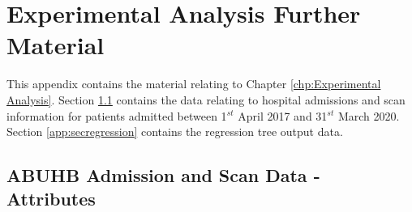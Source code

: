 \documentclass[thesis.tex]{subfiles}
\begin{document}
\chapter{Experimental Analysis Further Material}\label{App:experimental}

This appendix contains the material relating to Chapter \ref{chp:Experimental Analysis}. Section \ref{app:secdata} contains the data relating to hospital admissions and scan information for patients admitted between 1$^{st}$ April 2017 and 31$^{st}$ March 2020. Section \ref{app:secregression} contains the regression tree output data. 


\section{ABUHB Admission and Scan Data - Attributes}\label{app:secdata}
\end{document}
